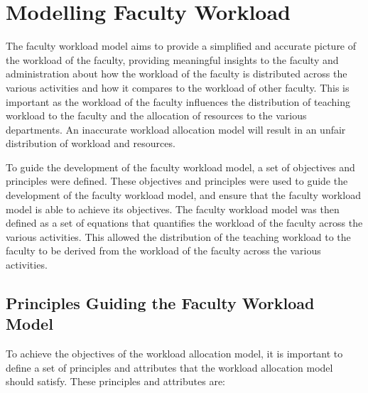 \section{Modelling Faculty Workload}

The faculty workload model aims to provide a simplified and accurate picture of the workload of the faculty, providing meaningful insights to the faculty and administration about how the workload of the faculty is distributed across the various activities and how it compares to the workload of other faculty. This is important as the workload of the faculty influences the distribution of teaching workload to the faculty and the allocation of resources to the various departments. An inaccurate workload allocation model will result in an unfair distribution of workload and resources.

To guide the development of the faculty workload model, a set of objectives and principles were defined. These objectives and principles were used to guide the development of the faculty workload model, and ensure that the faculty workload model is able to achieve its objectives. The faculty workload model was then defined as a set of equations that quantifies the workload of the faculty across the various activities. This allowed the distribution of the teaching workload to the faculty to be derived from the workload of the faculty across the various activities.

\subsection{Principles Guiding the Faculty Workload Model}
\label{sec:principles_guiding_workload_allocation_model}

To achieve the objectives of the workload allocation model, it is important to define a set of principles and attributes that the workload allocation model should satisfy. These principles and attributes are:

